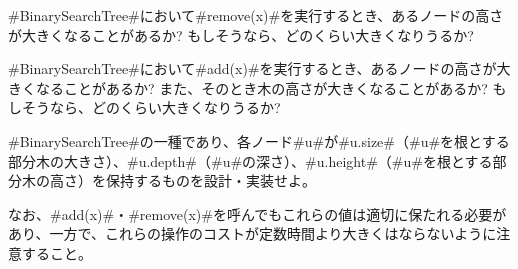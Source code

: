 \begin{exc}
#BinarySearchTree#において#remove(x)#を実行するとき、あるノードの高さが大きくなることがあるか?
もしそうなら、どのくらい大きくなりうるか?
\end{exc}

\begin{exc}
#BinarySearchTree#において#add(x)#を実行するとき、あるノードの高さが大きくなることがあるか?
また、そのとき木の高さが大きくなることがあるか?
もしそうなら、どのくらい大きくなりうるか?
\end{exc}

\begin{exc}
#BinarySearchTree#の一種であり、各ノード#u#が#u.size#（#u#を根とする部分木の大きさ）、#u.depth#（#u#の深さ）、#u.height#（#u#を根とする部分木の高さ）を保持するものを設計・実装せよ。

なお、#add(x)#・#remove(x)#を呼んでもこれらの値は適切に保たれる必要があり、一方で、これらの操作のコストが定数時間より大きくはならないように注意すること。
\end{exc}
